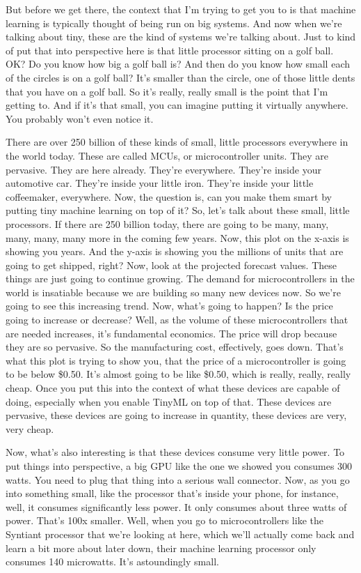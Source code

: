 But before we get there, the context that I'm trying to get you to is that machine learning is typically thought of being run on big systems.
And now when we're talking about tiny, these are the kind of systems we're talking about.
Just to kind of put that into perspective here is that little processor sitting on a golf ball.
OK?
Do you know how big a golf ball is?
And then do you know how small each of the circles is on a golf ball?
It's smaller than the circle, one of those little dents that you have on a golf ball.
So it's really, really small is the point that I'm getting to.
And if it's that small, you can imagine putting it virtually anywhere.
You probably won't even notice it.




There are over 250 billion of these kinds of small, little processors everywhere in the world today.
These are called MCUs, or microcontroller units.
They are pervasive.
They are here already.
They're everywhere.
They're inside your automotive car.
They're inside your little iron.
They're inside your little coffeemaker, everywhere.
Now, the question is, can you make them smart by putting tiny machine learning on top of it?
So, let's talk about these small, little processors.
If there are 250 billion today, there are going to be many, many, many, many, many more in the coming few years.
Now, this plot on the x-axis is showing you years.
And the y-axis is showing you the millions of units that are going to get shipped, right?
Now, look at the projected forecast values.
These things are just going to continue growing.
The demand for microcontrollers in the world is insatiable because we are building so many new devices now.
So we're going to see this increasing trend.
Now, what's going to happen?
Is the price going to increase or decrease?
Well, as the volume of these microcontrollers that are needed increases, it's fundamental economics.
The price will drop because they are so pervasive.
So the manufacturing cost, effectively, goes down.
That's what this plot is trying to show you, that the price of a microcontroller is going to be below \$0.50.
It's almost going to be like \$0.50, which is really, really, really cheap.
Once you put this into the context of what these devices are capable of doing, especially when you enable TinyML on top of that.
These devices are pervasive, these devices are going to increase in quantity, these devices are very, very cheap.


Now, what's also interesting is that these devices consume very little power.
To put things into perspective, a big GPU like the one we showed you consumes 300 watts.
You need to plug that thing into a serious wall connector.
Now, as you go into something small, like the processor that's inside your phone, for instance, well, it consumes significantly less power.
It only consumes about three watts of power.
That's 100x smaller.
Well, when you go to microcontrollers like the Syntiant processor that we're looking at here, which we'll actually come back and learn a bit more about later down, their machine learning processor only consumes 140 microwatts. It's astoundingly small.



